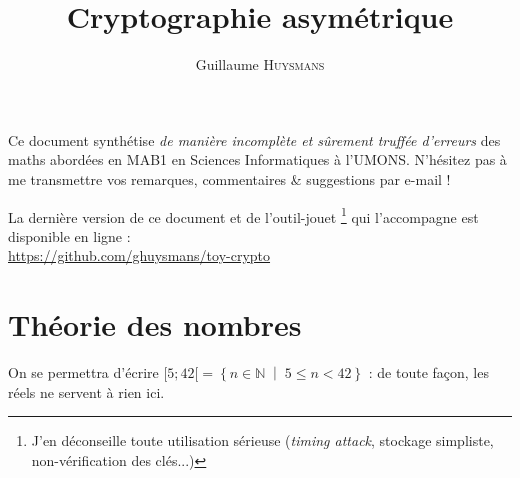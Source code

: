 \documentclass[11pt,twocolumn]{article}
\title{Cryptographie asymétrique}
\author{Guillaume \textsc{Huysmans}}
\theoremstyle{plain}
\newcommand{\esN}{\mathbb{N}} %
\begin{document}
\maketitle

Ce document synthétise
\emph{de manière incomplète et sûrement truffée d'erreurs}
des maths abordées en MAB1 en Sciences Informatiques à l'UMONS.
N'hésitez pas à me transmettre vos remarques,
commentaires \& suggestions par e-mail !

La dernière version de ce document et de l'outil-jouet
\footnote{J'en déconseille toute utilisation sérieuse
	(\emph{timing attack}, stockage simpliste,
	non-vérification des clés...)}
qui l'accompagne est disponible en ligne : \\
\url{https://github.com/ghuysmans/toy-crypto}


\section{Théorie des nombres}
On se permettra d'écrire
$[5;42[ = \left\{n \in \esN \; \middle| \; 5 \leq n < 42\right\}$ :
de toute façon, les réels ne servent à rien ici.
\end{document}
